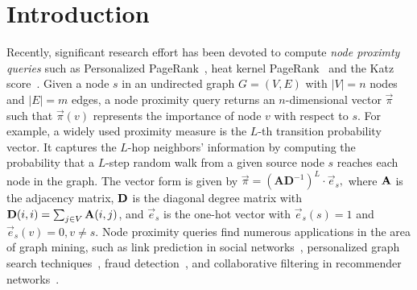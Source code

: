 \section{Introduction} \label{sec:intro}
Recently, significant research effort has been devoted to compute {\em node proximty queries} such as Personalized PageRank~\cite{page1999pagerank,jung2017bepi,Wang2017FORA,wei2018topppr}, heat kernel PageRank~\cite{chung2007HKPR,yang2019TEA} and the Katz score~\cite{katz1953Katz}. %
Given a node $s$ in an undirected graph $G=(V,E)$ with $|V|=n$ nodes and $|E|=m$ edges, a node proximity query  returns an $n$-dimensional vector $\vec{\pi}$ such that $\vec{\pi}(v)$ represents the importance of node $v$ with respect to $s$.  
For example, a widely used proximity measure is the $ L $-th transition probability vector. It captures the $ L $-hop neighbors' information by computing the probability that a $ L $-step random walk from a given source node $s$ reaches each node in the graph. 
The vector form is given by  $	\vec{\pi}= \left(\mathbf{A} \mathbf{D}^{-1} \right)^L \cdot \vec{e}_s,$
where $\mathbf{A} $ is the adjacency matrix, $\mathbf{D}$ is the diagonal degree matrix with $\mathbf{D}(i,i) = \sum_{j \in V} \mathbf{A}(i,j)$, and $\vec{e}_s$ is the one-hot vector with $\vec{e}_s(s)=1$ and $\vec{e}_s(v)=0, v\neq s$. 
Node proximity queries find numerous applications in the area of graph mining, such as link prediction in social networks~\cite{backstrom2011supervised}, personalized graph search techniques~\cite{jeh2003scaling}, fraud detection~\cite{andersen2008robust}, and collaborative filtering in recommender networks~\cite{gupta2013wtf}. 
 
